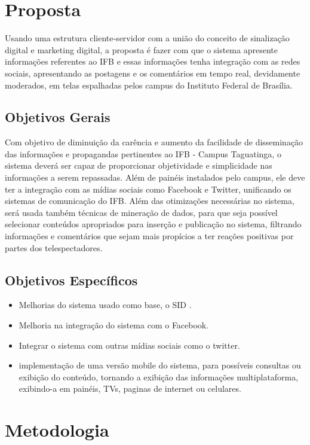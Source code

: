 \documentclass[
	12pt,				%
	openright,			%
	oneside,			%
	a4paper,			%
	english,			%
	french,				%
	spanish,			%
	brazil,				%
	]{abntex2}
\begin{document}
\section*{Proposta}
	Usando uma estrutura cliente-servidor com a união do conceito de sinalização digital e marketing digital, a proposta é fazer com que o sistema apresente informações referentes ao IFB e essas informações tenha integração com as redes sociais, apresentando as postagens e os comentários em tempo real, devidamente moderados, em telas espalhadas pelos campus do Instituto Federal de Brasília.
	
\subsection*{Objetivos Gerais}
	Com objetivo de diminuição da carência e aumento da facilidade de disseminação das informações e propagandas pertinentes ao IFB - Campus Taguatinga, o sistema deverá ser capaz de proporcionar objetividade e simplicidade nas informações a serem repassadas. Além de painéis instalados pelo campus, ele deve ter a integração com as mídias sociais como Facebook e Twitter, unificando os sistemas de comunicação do IFB. Além das otimizações necessárias no sistema, será usada também técnicas de mineração de dados, para que seja possível selecionar conteúdos apropriados para inserção e publicação no sistema, filtrando informações e comentários que sejam mais propícios a ter reações positivas por partes dos telespectadores.


\subsection*{Objetivos Específicos}
	 \begin{itemize}
	\item Melhorias do sistema usado como base, o SID \cite{sobrinho2017}.
	
	\item Melhoria na integração do sistema com o Facebook.
	
	\item Integrar o sistema com outras mídias sociais como o twitter.
	
	\item implementação de uma versão mobile do sistema, para possíveis consultas ou exibição do conteúdo, tornando a exibição das informações multiplataforma, exibindo-a em painéis, TVs, paginas de internet ou celulares.
	\end{itemize}
\section*{Metodologia}
\end{document}
